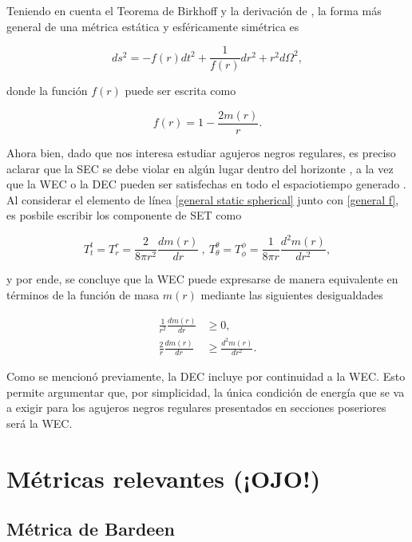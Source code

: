 \documentclass{article}
\numberwithin{equation}{section}
\begin{document}
Teniendo en cuenta el Teorema de Birkhoff y la derivación de \cite[Cap. 7]{carroll-lecture-notes}, la forma más general de una métrica estática y esféricamente simétrica es

\begin{equation}
\label{general static spherical}
ds^2 = -f(r)dt^2 + \frac{1}{f(r)}dr^2 + r^2d\Omega^2,
\end{equation}

donde la función $f(r)$ puede ser escrita como

\begin{equation}
\label{general f}
f(r) = 1 - \frac{2m(r)}{r}.
\end{equation}

Ahora bien, dado que nos interesa estudiar agujeros negros regulares, es preciso aclarar que la SEC se debe violar en algún lugar dentro del horizonte \cite{zaslavskii}, a la vez que la WEC o la DEC pueden ser satisfechas en todo el espaciotiempo generado \cite{dymnikova2004}. Al considerar el elemento de línea \eqref{general static spherical} junto con \eqref{general f}, es posbile escribir los componente de SET como \cite{vanegas-weak}

\begin{equation}
\label{wec set comp}
T^{t}_{t} = T^{r}_{r} = \frac{2}{8 \pi r^2} \frac{dm(r)}{dr}\ ,\ T^{\theta}_{\theta} = T^{\phi}_{\phi} = \frac{1}{8 \pi r} \frac{d^2m(r)}{dr^2},
\end{equation}

y por ende, se concluye que la WEC puede expresarse de manera equivalente en términos de la función de masa $m(r)$ mediante las siguientes desigualdades

\begin{align}
\label{mass wec ineq}
\frac{1}{r^2}\frac{dm(r)}{dr} &\geq 0,\\
\frac{2}{r}\frac{dm(r)}{dr} &\geq \frac{d^2m(r)}{dr^2}.
\end{align}

Como se mencionó previamente, la DEC incluye por continuidad a la WEC. Esto permite argumentar que, por simplicidad, la única condición de energía que se va a exigir para los agujeros negros regulares presentados en secciones poseriores será la WEC.

\section{\label{previous metrics} Métricas relevantes (¡OJO!)}

\subsection{\label{bardeen section} Métrica de Bardeen}
\end{document}
